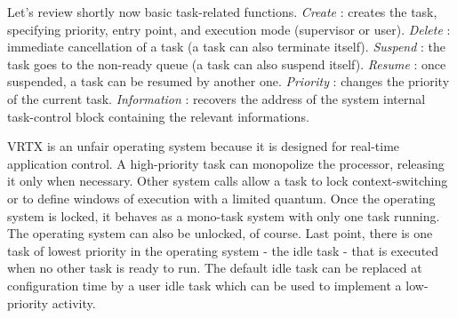 \documentclass[10pt]{report}
\begin{document}
Let's review shortly now basic task-related functions. {\em Create} : creates the task, specifying priority, entry point,
and execution mode (supervisor or user). {\em Delete} : immediate cancellation of a
task (a task can also terminate itself). {\em Suspend} : the task goes
to the non-ready queue (a task can also suspend itself). {\em Resume} : once suspended, a task
can be resumed by another one. {\em Priority} : changes the priority of the current task. {\em Information} : recovers
the address of the system internal task-control block containing the relevant informations.

VRTX is an unfair operating system because it is designed for
real-time application control. A high-priority task can
monopolize the processor, releasing it only when necessary. 
Other system calls allow a task to lock context-switching or
to define windows of execution with a limited quantum. Once the
operating system is locked, it behaves as a mono-task system with
only one task running. The operating system can also be unlocked,
of course. Last point, there is one task of lowest priority in the
operating system - the idle task - that is executed when no other
task is ready to run. The default idle task can be replaced at
configuration time by a user idle task which can be used to
implement a low-priority activity.
\end{document}
